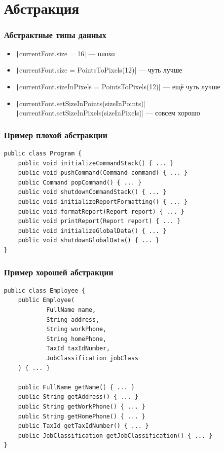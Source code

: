 \documentclass{../mcsslides}
\begin{document}
    \frame{\titlepage}

    \section{Абстракция}

    \begin{frame}
        \frametitle{Абстрактные типы данных}
        \begin{itemize}
            \item \texttt|currentFont.size = 16| --- плохо
            \item \texttt|currentFont.size = PointsToPixels(12)| --- чуть лучше
            \item \texttt|currentFont.sizeInPixels = PointsToPixels(12)| --- ещё чуть лучше
            \item \texttt|currentFont.setSizeInPoints(sizeInPoints)| \newline
                    \texttt|currentFont.setSizeInPixels(sizeInPixels)| --- совсем хорошо
        \end{itemize}
    \end{frame}

    \begin{frame}[fragile]
        \frametitle{Пример плохой абстракции}
        \begin{verbatim}
public class Program {
    public void initializeCommandStack() { ... }
    public void pushCommand(Command command) { ... }
    public Command popCommand() { ... }
    public void shutdownCommandStack() { ... }
    public void initializeReportFormatting() { ... }
    public void formatReport(Report report) { ... }
    public void printReport(Report report) { ... }
    public void initializeGlobalData() { ... }
    public void shutdownGlobalData() { ... }
}
        \end{verbatim}
    \end{frame}

    \begin{frame}[fragile]
        \frametitle{Пример хорошей абстракции}
        \begin{footnotesize}
            \begin{verbatim}
public class Employee {
    public Employee(
            FullName name,
            String address,
            String workPhone,
            String homePhone,
            TaxId taxIdNumber,
            JobClassification jobClass
    ) { ... }

    public FullName getName() { ... }
    public String getAddress() { ... }
    public String getWorkPhone() { ... }
    public String getHomePhone() { ... }
    public TaxId getTaxIdNumber() { ... }
    public JobClassification getJobClassification() { ... }
}
            \end{verbatim}
        \end{footnotesize}
    \end{frame}
\end{document}
